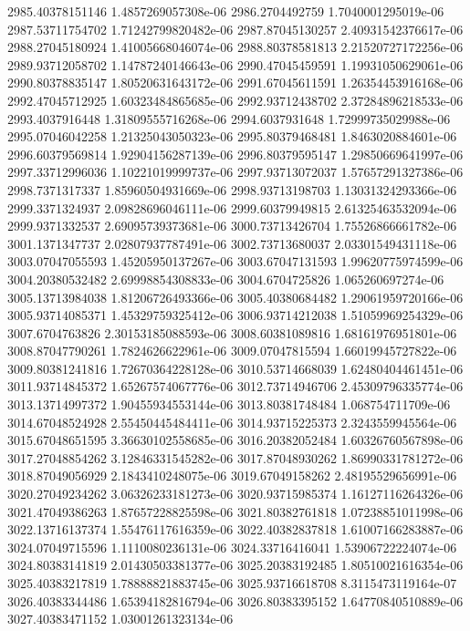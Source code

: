 {2985.40378151146 1.4857269057308e-06
2986.2704492759 1.7040001295019e-06
2987.53711754702 1.71242799820482e-06
2987.87045130257 2.40931542376617e-06
2988.27045180924 1.41005668046074e-06
2988.80378581813 2.21520727172256e-06
2989.93712058702 1.14787240146643e-06
2990.47045459591 1.19931050629061e-06
2990.80378835147 1.80520631643172e-06
2991.67045611591 1.26354453916168e-06
2992.47045712925 1.60323484865685e-06
2992.93712438702 2.37284896218533e-06
2993.4037916448 1.31809555716268e-06
2994.6037931648 1.72999735029988e-06
2995.07046042258 1.21325043050323e-06
2995.80379468481 1.8463020884601e-06
2996.60379569814 1.92904156287139e-06
2996.80379595147 1.29850669641997e-06
2997.33712996036 1.10221019999737e-06
2997.93713072037 1.57657291327386e-06
2998.7371317337 1.85960504931669e-06
2998.93713198703 1.13031324293366e-06
2999.3371324937 2.09828696046111e-06
2999.60379949815 2.61325463532094e-06
2999.9371332537 2.69095739373681e-06
3000.73713426704 1.75526866661782e-06
3001.1371347737 2.02807937787491e-06
3002.73713680037 2.03301549431118e-06
3003.07047055593 1.45205950137267e-06
3003.67047131593 1.99620775974599e-06
3004.20380532482 2.69998854308833e-06
3004.6704725826 1.065260697274e-06
3005.13713984038 1.81206726493366e-06
3005.40380684482 1.29061959720166e-06
3005.93714085371 1.45329759325412e-06
3006.93714212038 1.51059969254329e-06
3007.6704763826 2.30153185088593e-06
3008.60381089816 1.68161976951801e-06
3008.87047790261 1.7824626622961e-06
3009.07047815594 1.66019945727822e-06
3009.80381241816 1.72670364228128e-06
3010.53714668039 1.62480404461451e-06
3011.93714845372 1.65267574067776e-06
3012.73714946706 2.45309796335774e-06
3013.13714997372 1.90455934553144e-06
3013.80381748484 1.068754711709e-06
3014.67048524928 2.55450445484411e-06
3014.93715225373 2.3243559945564e-06
3015.67048651595 3.36630102558685e-06
3016.20382052484 1.60326760567898e-06
3017.27048854262 3.12846331545282e-06
3017.87048930262 1.86990331781272e-06
3018.87049056929 2.1843410248075e-06
3019.67049158262 2.48195529656991e-06
3020.27049234262 3.06326233181273e-06
3020.93715985374 1.16127116264326e-06
3021.47049386263 1.87657228825598e-06
3021.80382761818 1.07238851011998e-06
3022.13716137374 1.55476117616359e-06
3022.40382837818 1.61007166283887e-06
3024.07049715596 1.1110080236131e-06
3024.33716416041 1.53906722224074e-06
3024.80383141819 2.01430503381377e-06
3025.20383192485 1.80510021616354e-06
3025.40383217819 1.78888821883745e-06
3025.93716618708 8.3115473119164e-07
3026.40383344486 1.65394182816794e-06
3026.80383395152 1.64770840510889e-06
3027.40383471152 1.03001261323134e-06
}
